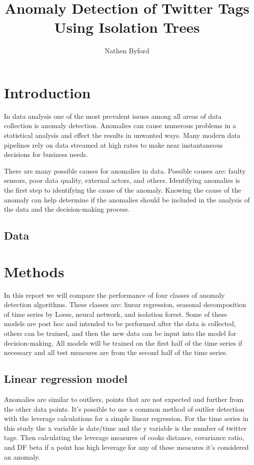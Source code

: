 \documentclass{article}
\title{Anomaly Detection of Twitter Tags Using Isolation Trees}
\author{Nathen Byford}
\date{}
\begin{document}
\maketitle

\tableofcontents

\newpage 

\section{Introduction}
In data analysis one of the most prevalent issues among all areas of data collection is anomaly detection. Anomalies can cause numerous problems in a statistical analysis and effect the results in unwanted ways. Many modern data pipelines rely on data streamed at high rates to make near instantaneous decisions for business needs. 

There are many possible causes for anomalies in data. Possible causes are: faulty sensors, poor data quality, external actors, and others. Identifying anomalies is the first step to identifying the cause of the anomaly. Knowing the cause of the anomaly can help determine if the anomalies should be included in the analysis of the data and the decision-making process.

\subsection{Data}

\section{Methods}
In this report we will compare the performance of four classes of anomaly detection algorithms. These classes are: linear regression, seasonal decomposition of time series by Loess, neural network, and isolation forest. Some of these models are post hoc and intended to be performed after the data is collected, others can be trained, and then the new data can be input into the model for decision-making. All models will be trained on the first half of the time series if necessary and all test measures are from the second half of the time series.

\subsection{Linear regression model}
Anomalies are similar to outliers, points that are not expected and further from the other data points. It's possible to use a common method of outlier detection with the leverage calculations for a simple linear regression. For the time series in this study the x variable is date/time and the y variable is the number of twitter tags. Then calculating the leverage measures of cooks distance, covariance ratio, and DF beta if a point has high leverage for any of these measures it's considered an anomaly. 
\end{document}
